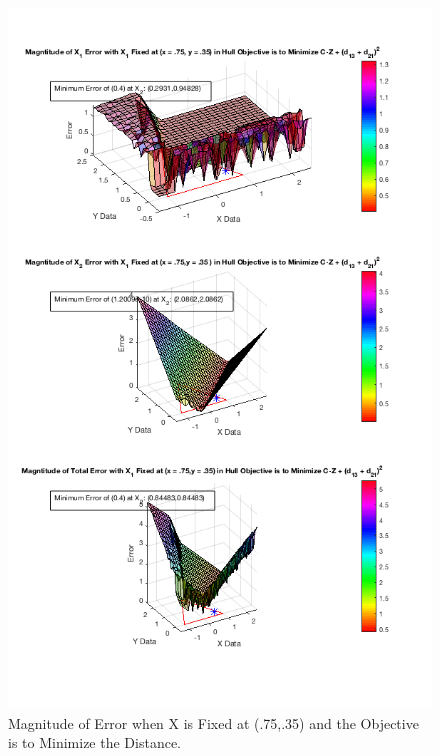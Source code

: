 \documentclass[answers]{exam}
\begin{document}
        \begin{figure}[H]
    \centering
    
        \caption{Magnitude of Error when X is Fixed at (.75,.35) and the Objective is to Minimize the Distance.}
    \includegraphics[scale=.7]{Problem8f6.png}
    \end{figure} 
\end{document}
